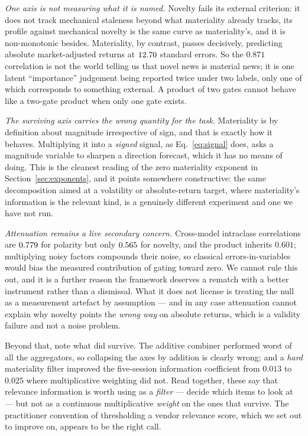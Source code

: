 \emph{One axis is not measuring what it is named.} Novelty fails its external
criterion: it does not track mechanical staleness beyond what materiality already
tracks, its profile against mechanical novelty is the same curve as materiality's,
and it is non-monotonic besides. Materiality, by contrast, passes decisively,
predicting absolute market-adjusted returns at $12.70$ standard errors. So
the $0.871$ correlation is not the world telling us that novel news is material
news; it is one latent ``importance'' judgement being reported twice under two
labels, only one of which corresponds to something external. A product of two
gates cannot behave like a two-gate product when only one gate exists.

\emph{The surviving axis carries the wrong quantity for the task.} Materiality is
by definition about magnitude irrespective of sign, and that is exactly how it
behaves. Multiplying it into a \emph{signed} signal, as Eq.~\eqref{eq:signal}
does, asks a magnitude variable to sharpen a direction forecast, which it has no
means of doing. This is the cleanest reading of the zero materiality exponent in
Section~\ref{sec:exponents}, and it points somewhere constructive: the same
decomposition aimed at a volatility or absolute-return target, where materiality's
information is the relevant kind, is a genuinely different experiment and one we
have not run.

\emph{Attenuation remains a live secondary concern.} Cross-model intraclass
correlations are $0.779$ for polarity but only $0.565$ for novelty, and the
product inherits $0.601$; multiplying noisy factors compounds their noise, so
classical errors-in-variables would bias the measured contribution of gating
toward zero. We cannot rule this out, and it is a further reason the framework
deserves a rematch with a better instrument rather than a dismissal. What it does
not license is treating the null as a measurement artefact by assumption --- and
in any case attenuation cannot explain why novelty points the \emph{wrong way} on
absolute returns, which is a validity failure and not a noise problem.

Beyond that, note what did survive.
The additive combiner performed worst of all the aggregators, so collapsing the
axes by addition is clearly wrong; and a \emph{hard} materiality filter improved
the five-session information coefficient from $0.013$ to $0.025$ where
multiplicative weighting did not. Read together, these say that relevance
information is worth using as a \emph{filter} --- decide which items to look at ---
but not as a continuous multiplicative \emph{weight} on the ones that survive. The
practitioner convention of thresholding a vendor relevance score, which we set out
to improve on, appears to be the right call.

